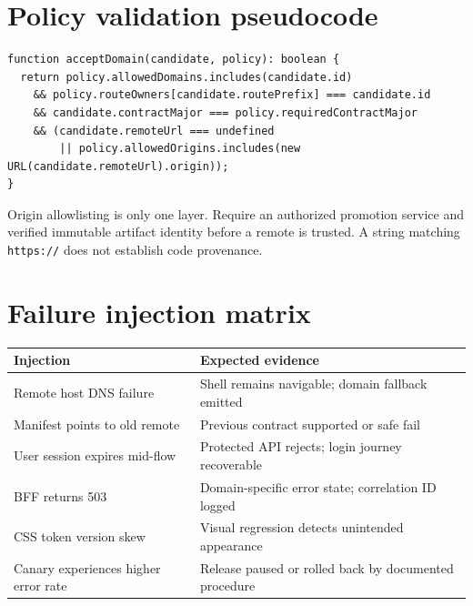 \documentclass[11pt,letterpaper,oneside]{report}
\begin{document}
\section*{Policy validation pseudocode}
\begin{lstlisting}[caption={Pseudocode; implement with actual schema validation}]
function acceptDomain(candidate, policy): boolean {
  return policy.allowedDomains.includes(candidate.id)
    && policy.routeOwners[candidate.routePrefix] === candidate.id
    && candidate.contractMajor === policy.requiredContractMajor
    && (candidate.remoteUrl === undefined
        || policy.allowedOrigins.includes(new URL(candidate.remoteUrl).origin));
}
\end{lstlisting}
\noindent Origin allowlisting is only one layer. Require an authorized promotion service and verified immutable artifact identity before a remote is trusted. A string matching \texttt{https://} does not establish code provenance.
\section*{Failure injection matrix}
\begin{tabularx}{\linewidth}{p{.34\linewidth}X}\toprule Injection & Expected evidence \\\midrule
Remote host DNS failure & Shell remains navigable; domain fallback emitted\\
Manifest points to old remote & Previous contract supported or safe fail\\
User session expires mid-flow & Protected API rejects; login journey recoverable\\
BFF returns 503 & Domain-specific error state; correlation ID logged\\
CSS token version skew & Visual regression detects unintended appearance\\
Canary experiences higher error rate & Release paused or rolled back by documented procedure\\\bottomrule\end{tabularx}
\end{document}
